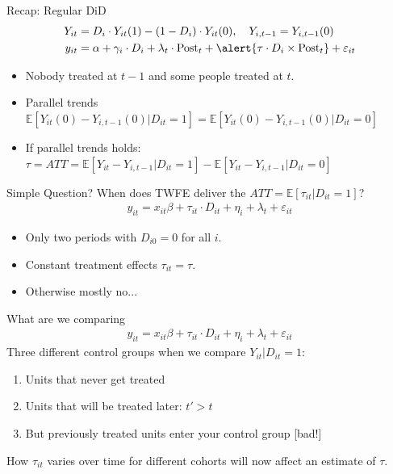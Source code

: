 \documentclass[aspectratio=169,11pt]{beamer}
\begin{document}
\begin{frame}{Recap: Regular DiD}
\begin{align*}
Y_{it} &= D_i  \cdot Y_{it}(1) - (1-D_i)\cdot  Y_{it}(0), \quad Y_{i,t-1} = Y_{i,t-1}(0)\\
y_{it} &= \alpha + \gamma_i \cdot D_i + \lambda_t \cdot \text{Post}_t +  \alert{\tau  \cdot D_i \times \text{Post}_t }+ \varepsilon_{it}
\end{align*}
\begin{itemize}
\item Nobody treated at $t-1$ and some people treated at $t$.
\item Parallel trends $\mathbb{E}[Y_{it}(0) - Y_{i,t-1}(0) | D_{it}=1] =\mathbb{E}[Y_{it}(0) - Y_{i,t-1}(0) | D_{it}=0]$
\item If parallel trends holds: $\tau = ATT = \mathbb{E}[Y_{it} - Y_{i,t-1} | D_{it}=1]-\mathbb{E}[Y_{it} - Y_{i,t-1} | D_{it}=0]  $
\end{itemize}
\end{frame}

\begin{frame}{Simple Question?}
When does TWFE deliver the $ATT=\mathbb{E}[\tau_{it} | D_{it}=1]$?
\begin{align*}
y_{it} = x_{it} \beta + \tau_{it} \cdot  D_{it} + \eta_i + \lambda_t + \varepsilon_{it}
\end{align*}
\begin{itemize}
\item Only two periods with $D_{i0}=0$ for all $i$.
\item  Constant treatment effects $\tau_{it} = \tau$.
\item Otherwise mostly no...
\end{itemize}
\end{frame}

\begin{frame}{What are we comparing}
\begin{align*}
y_{it} = x_{it} \beta + \tau_{it} \cdot  D_{it} + \eta_i + \lambda_t + \varepsilon_{it}
\end{align*}
Three different control groups when we compare $Y_{it} | D_{it}=1$:
\begin{enumerate}
\item Units that \alert{never get treated}
\item Units that \alert{will be treated later}: $t' > t$
\item But \alert{previously treated units} enter your control group [bad!]
\end{enumerate}
How $\tau_{it}$ varies over time for different \alert{cohorts} will now affect an estimate of $\tau$.
\end{frame}
\end{document}
